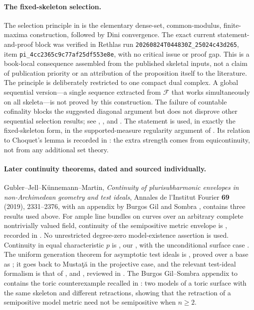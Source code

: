 \paragraph{The fixed-skeleton selection.}
The selection principle in  is the
elementary dense-set, common-modulus, finite-maxima construction, followed
by Dini convergence.  The exact current statement-and-proof block was
verified in Rethlas run
\nolinkurl{20260824T044830Z_25024c43d265}, item
\nolinkurl{pi_4cc2365c9c77af25df553e8e}, with no critical issue or proof gap.
This is a book-local consequence assembled from the published skeletal
inputs, not a claim of publication priority or an attribution of the
proposition itself to the literature.  The
principle is deliberately restricted to one compact dual complex.  A global
sequential version---a
single sequence extracted from $\mathcal F$ that works simultaneously on
all skeleta---is not proved by this construction.  The failure of
countable cofinality blocks the suggested diagonal argument but does not
disprove other sequential selection results; see ,
, and .  The
statement is used, in exactly the fixed-skeleton form, in the
supported-measure regularity argument of
.  Its relation to Choquet's lemma is
recorded in : the extra strength comes
from equicontinuity, not from any additional set theory.

\paragraph{Later continuity theorems, dated and sourced individually.}
Gubler--Jell--K\"unnemann--Martin, \emph{Continuity of plurisubharmonic
envelopes in non-Archimedean geometry and test ideals}, Annales de
l'Institut Fourier \textbf{69} (2019), 2331--2376, with an appendix by
Burgos Gil and Sombra \cite{GJKM19}, contains three results used above.
For ample line bundles on curves over an arbitrary complete nontrivially
valued field, continuity of the semipositive metric envelope is
\cite[Theorem~1.1]{GJKM19}, recorded in
.  No unrestricted degree-zero model-existence
assertion is used.  Continuity in equal
characteristic $p$ is \cite[Theorem~8.2]{GJKM19}, our
, with the unconditional
surface case \cite[Corollary~8.3]{GJKM19}.  The uniform generation theorem
for asymptotic test ideals is \cite[Theorem~1.3]{GJKM19}, proved over a base
as \cite[Theorem~4.6]{GJKM19}; it goes back to Musta\c{t}\u{a} in the projective
case, and the relevant test-ideal formalism is that of
\cite{MustataTest}, \cite{HY03} and \cite{ST12}, reviewed in
.  The Burgos Gil--Sombra appendix to
\cite{GJKM19} contains the toric counterexample recalled in
: two models of a toric surface with the
same skeleton and different retractions, showing that the retraction of a
semipositive model metric need not be semipositive when $n\geq2$.

